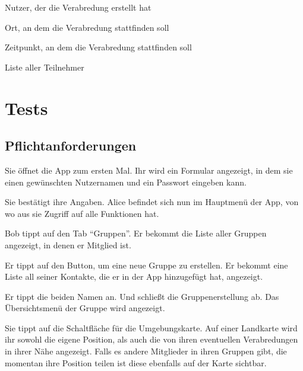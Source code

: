 \documentclass[parskip=full,11pt]{scrartcl}
\begin{document}
Nutzer, der die Verabredung erstellt hat

Ort, an dem die Verabredung stattfinden soll

Zeitpunkt, an dem die Verabredung stattfinden soll

Liste aller Teilnehmer

\pagebreak
\section{Tests}
\subsection{Pflichtanforderungen}

{Sie öffnet die App zum ersten Mal.}
{Ihr wird ein Formular angezeigt, in dem sie einen gewünschten Nutzernamen
und ein Passwort eingeben kann.}

{Sie bestätigt ihre Angaben.}
{Alice befindet sich nun im Hauptmenü der App, von wo aus sie Zugriff auf alle Funktionen hat.}


{Bob tippt auf den Tab  \enquote{Gruppen}.}
{Er bekommt die Liste aller Gruppen angezeigt, in denen er Mitglied ist.}

{Er tippt auf den Button, um eine neue Gruppe zu erstellen.}
{Er bekommt eine Liste all seiner Kontakte, die er in der App hinzugefügt hat, angezeigt.}

{Er tippt die beiden Namen an. Und schließt die Gruppenerstellung ab.}
{Das Übersichtsmenü der Gruppe wird angezeigt.}

{Sie tippt auf die Schaltfläche für die Umgebungskarte.}
{Auf einer Landkarte wird ihr sowohl die eigene Position, als auch die von ihren
eventuellen Verabredungen in ihrer Nähe angezeigt.
Falls es andere Mitglieder in ihren Gruppen gibt, die momentan
ihre Position teilen ist diese ebenfalls auf der Karte sichtbar.}
\end{document}
